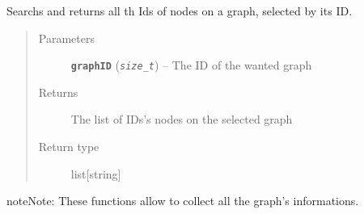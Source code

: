 \documentclass[letterpaper,10pt,english]{sphinxmanual}
\begin{document}
\begin{fulllineitems}
\label{doc:PythonGedLib.PyGetOriginalNodeIds}
Searchs and returns all th Ids of nodes on a graph, selected by its ID.
\begin{quote}\begin{description}
\item[{Parameters}] \leavevmode
\textbf{\texttt{graphID}} (\emph{\texttt{size\_t}}) -- The ID of the wanted graph

\item[{Returns}] \leavevmode
The list of IDs's nodes on the selected graph

\item[{Return type}] \leavevmode
list{[}string{]}

\end{description}\end{quote}

\begin{notice}{note}{Note:}
These functions allow to collect all the graph's informations.
\end{notice}

\end{fulllineitems}

\end{document}
